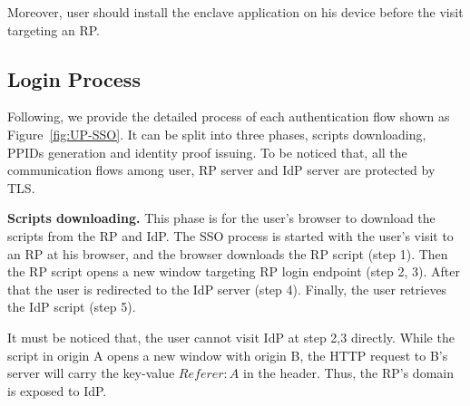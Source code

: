 Moreover, user should install the enclave application on his device before the visit targeting an RP.

\subsection{Login Process}
Following, we provide the detailed process of each authentication flow shown as Figure~\ref{fig:UP-SSO}.
It can be split into three phases, scripts downloading, PPIDs generation and identity proof issuing. To be noticed that, all the communication flows among user, RP server and IdP server are protected by TLS.

\vspace{0.5mm}\noindent\textbf{Scripts downloading.} This phase is for the user's browser to download the scripts from the RP and IdP. The SSO process is started with the user's visit to an RP at his browser, and the browser downloads the RP script (step 1). Then the RP script opens a new window targeting RP login endpoint (step 2, 3). After that the user is redirected to the IdP server (step 4). Finally, the user retrieves the IdP script (step 5).

It must be noticed that, the user cannot visit IdP at step 2,3 directly. While the script in origin A opens a new window with origin B, the HTTP request to B's server will carry the key-value $Referer: A$ in the header. Thus, the RP's domain is exposed to IdP.

